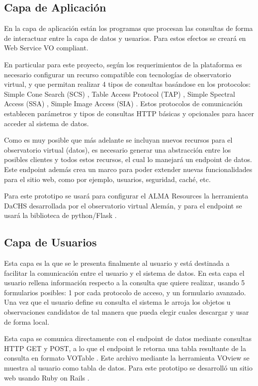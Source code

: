 \subsection{Capa de Aplicación}
En la capa de aplicación están los programas que procesan las consultas de
forma de interactuar entre la capa de datos y usuarios. Para estos efectos se
creará en Web Service VO compliant.

En particular para este proyecto, según los requerimientos de la plataforma es
necesario configurar un recurso compatible con tecnologías de observatorio
virtual, y que permitan realizar 4 tipos de consultas basándose en los
protocolos: Simple Cone Search (SCS) \cite{scs}, Table Access Protocol (TAP)
\cite{tap}, Simple Spectral Access (SSA) \cite{ssa}, Simple Image Access (SIA)
\cite{sia}. Estos protocolos de comunicación establecen parámetros y tipos de
consultas HTTP básicas y opcionales para hacer acceder al sistema de datos.

Como es muy posible que más adelante se incluyan nuevos recursos para el
observatorio virtual (datos), es necesario generar una abstracción entre los
posibles clientes y todos estos recursos, el cual lo manejará un endpoint de
datos. Este endpoint además crea un marco para poder extender nuevas
funcionalidades para el sitio web, como por ejemplo, usuarios, seguridad,
caché, etc.

Para este prototipo se usará para configurar el ALMA Resources la herramienta
DaCHS \cite{dachs} desarrollada por el observatorio virtual Alemán, y para el
endpoint se usará la biblioteca de python/Flask \cite{flask}.

\subsection{Capa de Usuarios}
Esta capa es la que se le presenta finalmente al usuario y está destinada a
facilitar la comunicación entre el usuario y el sistema de datos. En esta capa
el usuario rellena información respecto a la consulta que quiere realizar,
usando 5 formularios posibles: 1 por cada protocolo de acceso, y un formulario
avanzado. Una vez que el usuario define su consulta el sistema le arroja los
objetos u observaciones candidatos de tal manera que pueda elegir cuales
descargar y usar de forma local.

Esta capa se comunica directamente con el endpoint de datos mediante consultas
HTTP GET y POST, a lo que el endpoint le retorna una tabla resultante de la
consulta en formato VOTable \cite{votable}. Este archivo mediante la
herramienta VOview \cite{voview} se muestra al usuario como tabla de datos.
Para este prototipo se desarrolló un sitio web usando Ruby on Rails \cite{ror}.

